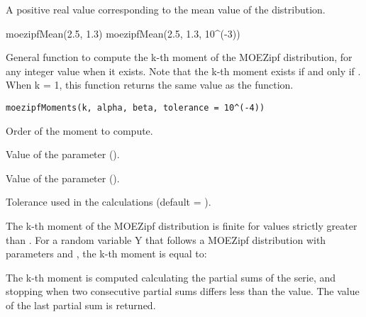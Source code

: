 \documentclass[letterpaper]{book}
\begin{document}
%
\begin{Value}
A positive real value corresponding to the mean value of the distribution.
\end{Value}
%
\begin{Examples}
\begin{ExampleCode}
moezipfMean(2.5, 1.3)
moezipfMean(2.5, 1.3, 10^(-3))
\end{ExampleCode}
\end{Examples}
%
\begin{Description}\relax
General function to compute the k-th moment of the MOEZipf distribution, for any integer value 
when it exists. Note that the k-th moment exists if and only if  .
When k = 1, this function returns the same value as the
 function.
\end{Description}
%
\begin{Usage}
\begin{verbatim}
moezipfMoments(k, alpha, beta, tolerance = 10^(-4))
\end{verbatim}
\end{Usage}
%
\begin{Arguments}
\begin{ldescription}
\item[\code{k}] Order of the moment to compute.

\item[\code{alpha}] Value of the \eqn{\alpha}{} parameter ().

\item[\code{beta}] Value of the \eqn{\beta}{} parameter ().

\item[\code{tolerance}] Tolerance used in the calculations (default = ).
\end{ldescription}
\end{Arguments}
%
\begin{Details}\relax
The k-th moment of the MOEZipf distribution is finite for \eqn{\alpha}{} values strictly greater than .
For a random variable Y that follows a MOEZipf distribution with parameters \eqn{\alpha}{} and \eqn{\beta}{},
the k-th moment is equal to:


The k-th moment is computed calculating the partial sums of the serie, and stopping when two
consecutive partial sums differs less than the  value.
The value of the last partial sum is returned.
\end{Details}
\end{document}
